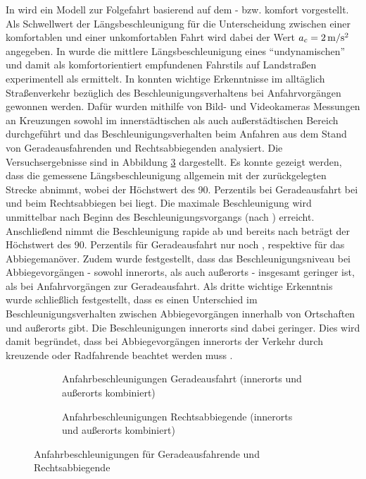 In \cite{Liu.2005} wird ein Modell zur Folgefahrt basierend auf dem - bzw. komfort vorgestellt. Als Schwellwert der Längsbeschleunigung für die Unterscheidung zwischen einer komfortablen und einer unkomfortablen Fahrt wird dabei der Wert $a_c = 2\,\mathrm{m/s^2}$ angegeben. In \cite{Radke.2013} wurde die mittlere Längsbeschleunigung eines ``undynamischen'' und damit als komfortorientiert empfundenen Fahrstils auf Landstraßen experimentell als  ermittelt. In \cite{Krause.2002} konnten wichtige Erkenntnisse im alltäglich Straßenverkehr bezüglich des Beschleunigungsverhaltens bei Anfahrvorgängen gewonnen werden. Dafür wurden mithilfe von Bild- und Videokameras Messungen an Kreuzungen sowohl im innerstädtischen als auch außerstädtischen Bereich durchgeführt und das Beschleunigungsverhalten beim Anfahren aus dem Stand von Geradeausfahrenden und Rechtsabbiegenden analysiert. Die Versuchsergebnisse sind in Abbildung \ref{fig:ax_s_krause} dargestellt. Es konnte gezeigt werden, dass die gemessene Längsbeschleunigung allgemein mit der zurückgelegten Strecke abnimmt, wobei der Höchstwert des 90. Perzentils bei Geradeausfahrt bei  und beim Rechtsabbiegen bei  liegt. Die maximale Beschleunigung wird unmittelbar nach Beginn des Beschleunigungsvorgangs (nach ) erreicht. Anschließend nimmt die Beschleunigung rapide ab und bereits nach  beträgt der Höchstwert des 90. Perzentils für Geradeausfahrt nur noch , respektive  für das Abbiegemanöver. Zudem wurde festgestellt, dass das Beschleunigungsniveau bei Abbiegevorgängen - sowohl innerorts, als auch außerorts - insgesamt geringer ist, als bei Anfahrvorgängen zur Geradeausfahrt. Als dritte wichtige Erkenntnis wurde schließlich festgestellt, dass es einen Unterschied im Beschleunigungsverhalten zwischen Abbiegevorgängen innerhalb von Ortschaften und außerorts gibt. Die Beschleunigungen innerorts sind dabei geringer. Dies wird damit begründet, dass bei Abbiegevorgängen innerorts der Verkehr durch kreuzende  oder Radfahrende beachtet werden muss \cite{Krause.2002}. 
\begin{figure}[h]
	\centering
	\begin{subfigure}[b]{0.49\linewidth}
		\centering
		\fontsize{32pt}{16pt}\selectfont
		\caption{Anfahrbeschleunigungen Geradeausfahrt (innerorts und außerorts kombiniert)}
		\label{fig:ax_s_geradeaus_krause}
	\end{subfigure}
	\hfill
	\begin{subfigure}[b]{0.49\textwidth}
		\centering
		\fontsize{32pt}{16pt}\selectfont
		\caption{Anfahrbeschleunigungen Rechtsabbiegende (innerorts und außerorts kombiniert)}
		\label{fig:ax_s_abbiegen_krause}
	\end{subfigure}
	\caption{Anfahrbeschleunigungen für Geradeausfahrende und Rechtsabbiegende \cite{Krause.2002}}
	\label{fig:ax_s_krause}
\end{figure}
